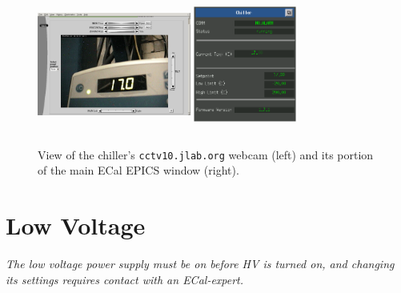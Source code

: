 \documentclass[12pt]{article}
\begin{document}
\begin{figure}[htbp]
\center
\includegraphics[width=0.45\textwidth,height=4.5cm]{pics/ChillerCam_2014_12_20.png}
\includegraphics[width=0.3\textwidth,height=4.5cm]{pics/epics_ecal_chiller.png}
\caption{ \label{ChillerCam} View of the chiller's \texttt{cctv10.jlab.org} webcam (left) and its portion of the main ECal EPICS window (right).}
\end{figure}

\newpage

\section{Low Voltage}
{\em The low voltage power supply must be on before HV is turned on, and changing its settings requires contact with an ECal-expert.}
      
\end{document}
